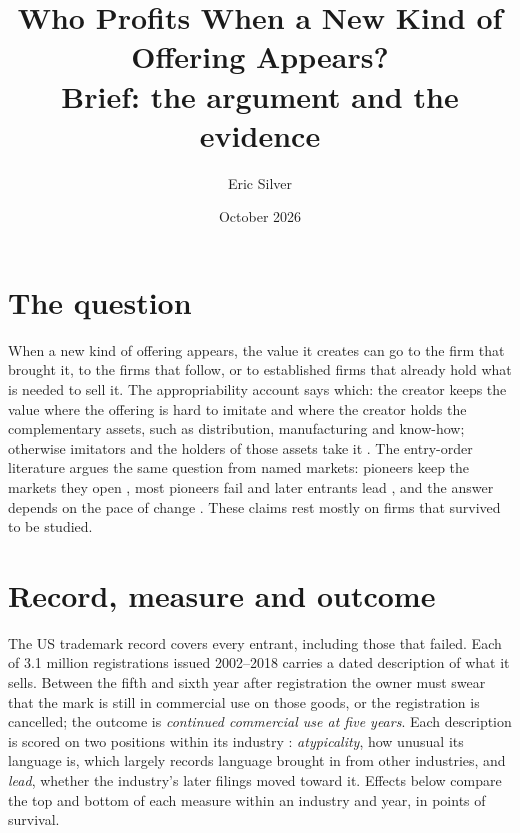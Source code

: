 
\graphicspath{{../../}}
\makeatletter{}\makeatother
\title{\bfseries Who Profits When a New Kind of Offering Appears?\\
\large Brief: the argument and the evidence}
\author{Eric Silver}
\date{October 2026}


\maketitle

\section*{The question}

When a new kind of offering appears, the value it creates can go to the
firm that brought it, to the firms that follow, or to established firms
that already hold what is needed to sell it. The appropriability account
says which: the creator keeps the value where the offering is hard to
imitate and where the creator holds the complementary assets, such as
distribution, manufacturing and know-how; otherwise imitators and the
holders of those assets take it \citep{Teece1986}. The entry-order
literature argues the same question from named markets: pioneers keep
the markets they open \citep{RobinsonFornell1985, LiebermanMontgomery1988},
most pioneers fail and later entrants lead \citep{GolderTellis1993}, and
the answer depends on the pace of change \citep{SuarezLanzolla2007}.
These claims rest mostly on firms that survived to be studied.

\section*{Record, measure and outcome}

The US trademark record covers every entrant, including those that
failed. Each of 3.1 million registrations issued 2002--2018 carries a
dated description of what it sells. Between the fifth and sixth year
after registration the owner must swear that the mark is still in
commercial use on those goods, or the registration is cancelled; the
outcome is \emph{continued commercial use at five years}. Each
description is scored on two positions within its industry
\citep{SilverCorpus2026}: \emph{atypicality}, how unusual its language
is, which largely records language brought in from other industries, and
\emph{lead}, whether the industry's later filings moved toward it. Effects
below compare the top and bottom of each measure within an industry and
year, in points of survival.

